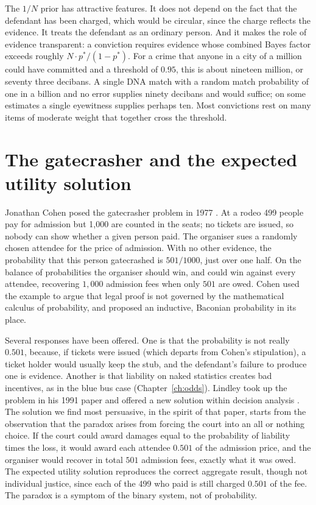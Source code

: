 The $1/N$ prior has attractive features. It does not depend on the fact that the defendant has been charged, which would be circular, since the charge reflects the evidence. It treats the defendant as an ordinary person. And it makes the role of evidence transparent: a conviction requires evidence whose combined Bayes factor exceeds roughly $N \cdot p^\ast/(1-p^\ast)$. For a crime that anyone in a city of a million could have committed and a threshold of $0.95$, this is about nineteen million, or seventy three decibans. A single DNA match with a random match probability of one in a billion and no error supplies ninety decibans and would suffice; on some estimates a single eyewitness supplies perhaps ten. Most convictions rest on many items of moderate weight that together cross the threshold.

\section{The gatecrasher and the expected utility solution}

Jonathan Cohen posed the gatecrasher problem in 1977 \citep{cohen1977}. At a rodeo 499 people pay for admission but 1{,}000 are counted in the seats; no tickets are issued, so nobody can show whether a given person paid. The organiser sues a randomly chosen attendee for the price of admission. With no other evidence, the probability that this person gatecrashed is $501/1000$, just over one half. On the balance of probabilities the organiser should win, and could win against every attendee, recovering $1{,}000$ admission fees when only $501$ are owed. Cohen used the example to argue that legal proof is not governed by the mathematical calculus of probability, and proposed an inductive, Baconian probability in its place.

Several responses have been offered. One is that the probability is not really $0.501$, because, if tickets were issued (which departs from Cohen's stipulation), a ticket holder would usually keep the stub, and the defendant's failure to produce one is evidence. Another is that liability on naked statistics creates bad incentives, as in the blue bus case (Chapter~\ref{ch:odds}). Lindley took up the problem in his 1991 paper and offered a new solution within decision analysis \citep{lindley1991}. The solution we find most persuasive, in the spirit of that paper, starts from the observation that the paradox arises from forcing the court into an all or nothing choice. If the court could award damages equal to the probability of liability times the loss, it would award each attendee $0.501$ of the admission price, and the organiser would recover in total $501$ admission fees, exactly what it was owed. The expected utility solution reproduces the correct aggregate result, though not individual justice, since each of the 499 who paid is still charged $0.501$ of the fee. The paradox is a symptom of the binary system, not of probability.

